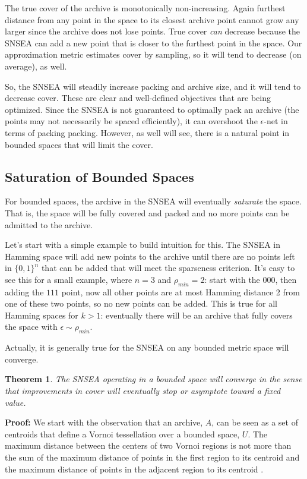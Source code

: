 \documentclass[twoside]{article}
\newtheorem{theorem}{Theorem}
\begin{document}
The true cover of the archive is monotonically non-increasing.  Again furthest distance from any point in the space to its closest archive point cannot grow any larger since the archive does not lose points.  True cover \emph{can} decrease because the SNSEA can add a new point that is closer to the furthest point in the space.  Our approximation metric estimates cover by sampling, so it will tend to decrease (on average), as well.  

So, the SNSEA will steadily increase packing and archive size, and it will tend to decrease cover.  These are clear and well-defined objectives that are being optimized.  Since the SNSEA is not guaranteed to optimally pack an archive (the points may not necessarily be spaced efficiently), it can overshoot the $\epsilon$-net in terms of packing packing.  However, as well will see, there is a natural point in bounded spaces that will limit the cover.


\subsection{Saturation of Bounded Spaces}
\label{subsec:saturation}
For bounded spaces, the archive in the SNSEA will eventually \emph{saturate} the space.  That is, the space will be fully covered and packed and no more points can be admitted to the archive.  

Let's start with a simple example to build intuition for this.  The  SNSEA in Hamming space will add new points to the archive until there are no points left in $\{0,1\}^n$ that can be added that will meet the sparseness criterion.  It's easy to see this for a small example, where $n=3$ and $\rho_{min} = 2$:  start with the $000$, then adding the $111$ point, now all other points are at most Hamming distance 2 from one of these two points, so no new points can be added.  This is true for all Hamming spaces for $k>1$:  eventually there will be an archive that fully covers the space with $\epsilon \sim \rho_{min}$.

Actually, it is generally true for the SNSEA on any bounded metric space will converge.
\begin{theorem}
The SNSEA operating in a bounded space will converge in the sense that improvements in \emph{cover} will eventually stop or asymptote toward a fixed value.
\end{theorem}
\textbf{Proof:} We start with the observation that an archive, $A$, can be seen as a set of centroids that define a Vornoi tessellation \cite{??} over a bounded space, $U$.  The maximum distance between the centers of two Vornoi regions is not more than the sum of the maximum distance of points in the first region to its centroid and the maximum distance of points in the adjacent region to its centroid \cite{??}.  
\end{document}
